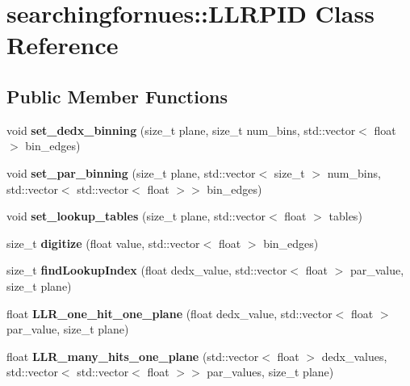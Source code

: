\hypertarget{classsearchingfornues_1_1LLRPID}{}\section{searchingfornues\+:\+:L\+L\+R\+P\+ID Class Reference}
\label{classsearchingfornues_1_1LLRPID}
\subsection*{Public Member Functions}
\begin{DoxyCompactItemize}
\item 
void {\bfseries set\+\_\+dedx\+\_\+binning} (size\+\_\+t plane, size\+\_\+t num\+\_\+bins, std\+::vector$<$ float $>$ bin\+\_\+edges)\hypertarget{classsearchingfornues_1_1LLRPID_aa8fb15d37ae277de14b449ee3d734b4b}{}\label{classsearchingfornues_1_1LLRPID_aa8fb15d37ae277de14b449ee3d734b4b}

\item 
void {\bfseries set\+\_\+par\+\_\+binning} (size\+\_\+t plane, std\+::vector$<$ size\+\_\+t $>$ num\+\_\+bins, std\+::vector$<$ std\+::vector$<$ float $>$$>$ bin\+\_\+edges)\hypertarget{classsearchingfornues_1_1LLRPID_a9823701e9059de54a55cf8d180a3c42d}{}\label{classsearchingfornues_1_1LLRPID_a9823701e9059de54a55cf8d180a3c42d}

\item 
void {\bfseries set\+\_\+lookup\+\_\+tables} (size\+\_\+t plane, std\+::vector$<$ float $>$ tables)\hypertarget{classsearchingfornues_1_1LLRPID_a8596d9156bc1771641c3245e9cd71a94}{}\label{classsearchingfornues_1_1LLRPID_a8596d9156bc1771641c3245e9cd71a94}

\item 
size\+\_\+t {\bfseries digitize} (float value, std\+::vector$<$ float $>$ bin\+\_\+edges)\hypertarget{classsearchingfornues_1_1LLRPID_af605394ef38223a1600904c181828486}{}\label{classsearchingfornues_1_1LLRPID_af605394ef38223a1600904c181828486}

\item 
size\+\_\+t {\bfseries find\+Lookup\+Index} (float dedx\+\_\+value, std\+::vector$<$ float $>$ par\+\_\+value, size\+\_\+t plane)\hypertarget{classsearchingfornues_1_1LLRPID_a891182e0af5e60e975e86ea5d2973e11}{}\label{classsearchingfornues_1_1LLRPID_a891182e0af5e60e975e86ea5d2973e11}

\item 
float {\bfseries L\+L\+R\+\_\+one\+\_\+hit\+\_\+one\+\_\+plane} (float dedx\+\_\+value, std\+::vector$<$ float $>$ par\+\_\+value, size\+\_\+t plane)\hypertarget{classsearchingfornues_1_1LLRPID_a615612fe3657b51e18bf1e514399363a}{}\label{classsearchingfornues_1_1LLRPID_a615612fe3657b51e18bf1e514399363a}

\item 
float {\bfseries L\+L\+R\+\_\+many\+\_\+hits\+\_\+one\+\_\+plane} (std\+::vector$<$ float $>$ dedx\+\_\+values, std\+::vector$<$ std\+::vector$<$ float $>$$>$ par\+\_\+values, size\+\_\+t plane)\hypertarget{classsearchingfornues_1_1LLRPID_ac8090da570daccff827fa96685b54f1e}{}\label{classsearchingfornues_1_1LLRPID_ac8090da570daccff827fa96685b54f1e}

\end{DoxyCompactItemize}
